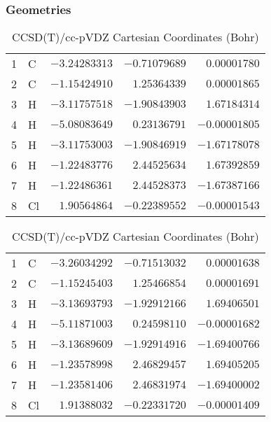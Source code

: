 \documentclass[10pt,oneside]{article}
\begin{document}
\begin{table}[h!]
\subsubsection*{Geometries}
\begin{multicols}{2}
\centering
\caption{CCSD(T)/cc-pVTZ Cartesian Coordinates (Bohr)}
\begin{tabular}{llrrr}
\toprule
1  & C  & $-3.24283313$ & $-0.71079689$ & $ 0.00001780$ \\
2  & C  & $-1.15424910$ & $ 1.25364339$ & $ 0.00001865$ \\
3  & H  & $-3.11757518$ & $-1.90843903$ & $ 1.67184314$ \\
4  & H  & $-5.08083649$ & $ 0.23136791$ & $-0.00001805$ \\
5  & H  & $-3.11753003$ & $-1.90846919$ & $-1.67178078$ \\
6  & H  & $-1.22483776$ & $ 2.44525634$ & $ 1.67392859$ \\
7  & H  & $-1.22486361$ & $ 2.44528373$ & $-1.67387166$ \\
8  & Cl & $ 1.90564864$ & $-0.22389552$ & $-0.00001543$ \\
\bottomrule
\end{tabular}
\caption{CCSD(T)/cc-pVDZ Cartesian Coordinates (Bohr)}
\begin{tabular}{llrrr}
\toprule
1  & C  & $-3.26034292$ & $-0.71513032$ & $ 0.00001638$ \\
2  & C  & $-1.15245403$ & $ 1.25466854$ & $ 0.00001691$ \\
3  & H  & $-3.13693793$ & $-1.92912166$ & $ 1.69406501$ \\
4  & H  & $-5.11871003$ & $ 0.24598110$ & $-0.00001682$ \\
5  & H  & $-3.13689609$ & $-1.92914916$ & $-1.69400766$ \\
6  & H  & $-1.23578998$ & $ 2.46829457$ & $ 1.69405205$ \\
7  & H  & $-1.23581406$ & $ 2.46831974$ & $-1.69400002$ \\
8  & Cl & $ 1.91388032$ & $-0.22331720$ & $-0.00001409$ \\
\bottomrule
\end{tabular}
\end{multicols}
\end{table}
\end{document}
